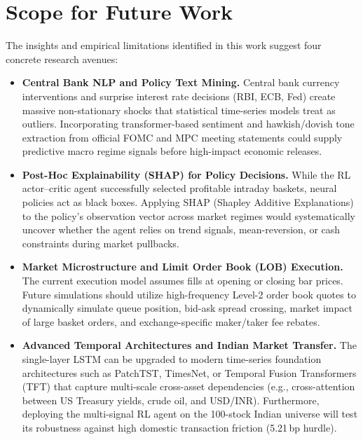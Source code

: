 \documentclass[12pt,a4paper,twoside,openany]{report}
\begin{document}
\section{Scope for Future Work}
The insights and empirical limitations identified in this work suggest four concrete research avenues:

\begin{itemize}[leftmargin=1.5cm, itemsep=3pt]
  \item \textbf{Central Bank NLP and Policy Text Mining.} Central bank currency interventions and surprise interest rate decisions (RBI, ECB, Fed) create massive non-stationary shocks that statistical time-series models treat as outliers. Incorporating transformer-based sentiment and hawkish/dovish tone extraction from official FOMC and MPC meeting statements could supply predictive macro regime signals before high-impact economic releases.
  
  \item \textbf{Post-Hoc Explainability (SHAP) for Policy Decisions.} While the RL actor--critic agent successfully selected profitable intraday baskets, neural policies act as black boxes. Applying SHAP (Shapley Additive Explanations) to the policy's observation vector across market regimes would systematically uncover whether the agent relies on trend signals, mean-reversion, or cash constraints during market pullbacks.

  \item \textbf{Market Microstructure and Limit Order Book (LOB) Execution.} The current execution model assumes fills at opening or closing bar prices. Future simulations should utilize high-frequency Level-2 order book quotes to dynamically simulate queue position, bid-ask spread crossing, market impact of large basket orders, and exchange-specific maker/taker fee rebates.

  \item \textbf{Advanced Temporal Architectures and Indian Market Transfer.} The single-layer LSTM can be upgraded to modern time-series foundation architectures such as PatchTST, TimesNet, or Temporal Fusion Transformers (TFT) that capture multi-scale cross-asset dependencies (e.g., cross-attention between US Treasury yields, crude oil, and USD/INR). Furthermore, deploying the multi-signal RL agent on the 100-stock Indian universe will test its robustness against high domestic transaction friction (5.21\,bp hurdle).
\end{itemize}


\appendix
\end{document}
